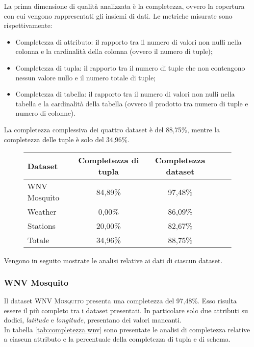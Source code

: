 La prima dimensione di qualità analizzata è la completezza, ovvero la copertura 
con cui vengono rappresentati gli insiemi di dati. Le metriche misurate sono 
rispettivamente:
\begin{itemize}
	\item Completezza di attributo: il rapporto tra il numero di valori non
	nulli nella colonna e la cardinalità della colonna (ovvero il numero di 
	tuple);
	\item Completezza di tupla: il rapporto tra il numero di tuple che non 
	contengono nessun valore nullo e il numero totale di tuple;
	\item Completezza di tabella: il rapporto tra il numero di valori non nulli 
	nella tabella e la cardinalità della tabella (ovvero il prodotto tra numero 
	di tuple e numero di colonne).
\end{itemize}


La completezza complessiva dei quattro dataset è del 88,75\%, mentre la 
completezza delle tuple è solo del 34,96\%.

\begin{figure}[H]
	\centering
	\begin{tabular}{lcccc}
		\toprule
		\textbf{Dataset} \quad & \textbf{Completezza di tupla} & \textbf{Completezza dataset} \\
		\midrule
		WNV Mosquito &		84,89\%  	& 97,48\%  \\ 
		Weather 	 &		 0,00\% 	& 86,09\%  \\ 
		Stations 	 &		20,00\% 	& 82,67\%  \\ 
		\midrule
		Totale 		 &	    34,96\%     & 88,75\%  \\
		\bottomrule
	\end{tabular}
	\label{tab:completezza totale}
\end{figure}

Vengono in seguito mostrate le analisi relative ai dati di ciascun dataset.

\subsubsection*{WNV Mosquito}
Il dataset \textsc{WNV Mosquito} presenta una completezza del 97,48\%. Esso risulta essere il più completo tra i dataset presentati. In particolare solo due attributi su dodici, \textit{latitude} e \textit{longitude}, presentano dei valori mancanti.\\
In tabella \ref{tab:completezza wnv} sono presentate le analisi di completezza relative a ciascun attributo e la percentuale della completezza di tupla e di schema.

